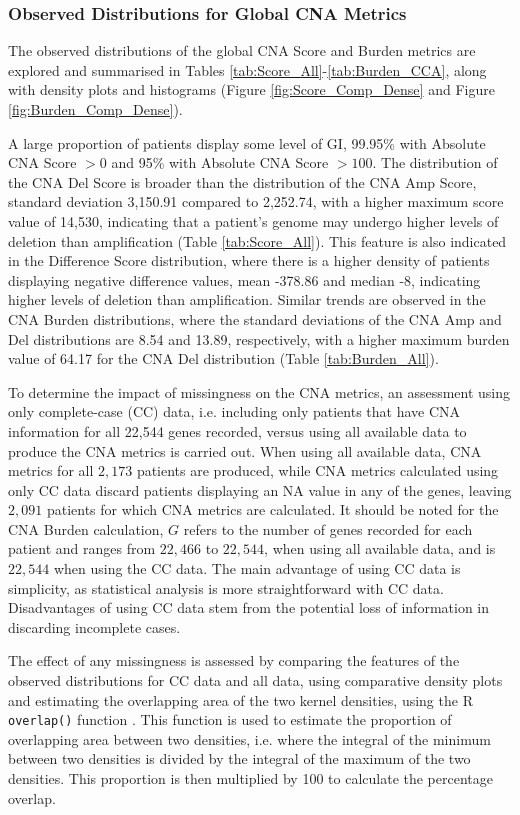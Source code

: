 \subsubsection{Observed Distributions for Global CNA Metrics}
The observed distributions of the global CNA Score and Burden metrics are explored and summarised in Tables \ref{tab:Score_All}-\ref{tab:Burden_CCA}, along with density plots and histograms (Figure \ref{fig:Score_Comp_Dense} and Figure \ref{fig:Burden_Comp_Dense}).   

A large proportion of patients display some level of GI, 99.95\% with Absolute CNA Score $>0$ and 95\% with Absolute CNA Score $>100$. The distribution of the CNA Del Score is broader than the distribution of the CNA Amp Score, standard deviation 3,150.91 compared to 2,252.74, with a higher maximum score value of 14,530, indicating that a patient's genome may undergo higher levels of deletion than amplification (Table \ref{tab:Score_All}). This feature is also indicated in the Difference Score distribution, where there is a higher density of patients displaying negative difference values, mean -378.86 and median -8, indicating higher levels of deletion than amplification. Similar trends are observed in the CNA Burden distributions, where the standard deviations of the CNA Amp and Del distributions are 8.54 and 13.89, respectively, with a higher maximum burden value of 64.17 for the CNA Del distribution (Table \ref{tab:Burden_All}). 

To determine the impact of missingness on the CNA metrics, an assessment using only complete-case (CC) data, i.e. including only patients that have CNA information for all 22,544 genes recorded, versus using all available data to produce the CNA metrics is carried out. When using all available data, CNA metrics for all $2,173$ patients are produced, while CNA metrics calculated using only CC data discard patients displaying an NA value in any of the genes, leaving $2,091$ patients for which CNA metrics are calculated. It should be noted for the CNA Burden calculation, $G$ refers to the number of genes recorded for each patient and ranges from $22,466$ to $22,544$, when using all available data, and is $22,544$ when using the CC data. The main advantage of using CC data is simplicity, as statistical analysis is more straightforward with CC data. Disadvantages of using CC data stem from the potential loss of information in discarding incomplete cases. 

The effect of any missingness is assessed by comparing the features of the observed distributions for CC data and all data, using comparative density plots and estimating the overlapping area of the two kernel densities, using the R \texttt{overlap()} function \citep{Overlap}. This function is used to estimate the proportion of overlapping area between two densities, i.e. where the integral of the minimum between two densities is divided by the integral of the maximum of the two densities. This proportion is then multiplied by 100 to calculate the percentage overlap. 

